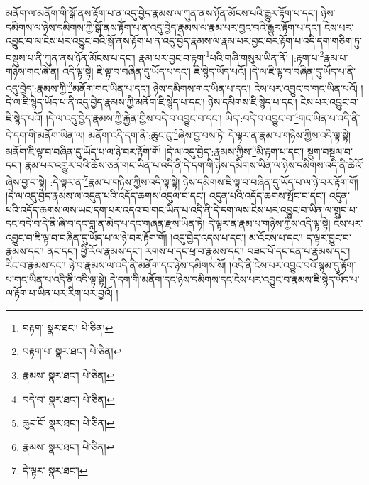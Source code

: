མནོག་ལ་མནོག་གི་སྒོ་ནས་རྟོག་པ་ན་འདུ་བྱེད་རྣམས་ལ་ཀུན་ནས་ཉོན་མོངས་པའི་རྒྱུར་རྟོག་པ་དང་། ཉེས་དམིགས་ལ་ཉེས་དམིགས་ཀྱི་སྒོ་ནས་རྟོག་པ་ན་འདུ་བྱེད་རྣམས་ལ་རྣམ་པར་བྱང་བའི་རྒྱུར་རྟོག་པ་དང་། ངེས་པར་འབྱུང་བ་ལ་ངེས་པར་འབྱུང་བའི་སྒོ་ནས་རྟོག་པ་ན་འདུ་བྱེད་རྣམས་ལ་རྣམ་པར་བྱང་བར་རྟོག་པ་འདི་དག་གཅིག་ཏུ་བསྡུས་པ་ནི་ཀུན་ནས་ཉོན་མོངས་པ་དང་། རྣམ་པར་བྱང་བ་རྟག་\footnote{བརྟག་  སྣར་ཐང་།  པེ་ཅིན། }པའི་གཞི་གསུམ་ཡིན་ནོ། །:རྟག་པ་\footnote{བརྟག་པ་  སྣར་ཐང་།  པེ་ཅིན། }རྣམ་པ་གཉིས་གང་ཞེ་ན། འདི་ལྟ་སྟེ། ཇི་ལྟ་བ་བཞིན་དུ་ཡོད་པ་དང་། ཇི་སྙེད་ཡོད་པའོ། །དེ་ལ་ཇི་ལྟ་བ་བཞིན་དུ་ཡོད་པ་ནི་འདུ་བྱེད་:རྣམས་ཀྱི་\footnote{རྣམས་  སྣར་ཐང་།  པེ་ཅིན། }མནོག་གང་ཡིན་པ་དང་། ཉེས་དམིགས་གང་ཡིན་པ་དང་། ངེས་པར་འབྱུང་བ་གང་ཡིན་པའོ། །དེ་ལ་ཇི་སྙེད་ཡོད་པ་ནི་འདུ་བྱེད་རྣམས་ཀྱི་མནོག་ཇི་སྙེད་པ་དང་། ཉེས་དམིགས་ཇི་སྙེད་པ་དང་། ངེས་པར་འབྱུང་བ་ཇི་སྙེད་པའོ། །དེ་ལ་འདུ་བྱེད་རྣམས་ཀྱི་རྐྱེན་གྱིས་བདེ་བ་འབྱུང་བ་དང་། ཡིད་:བདེ་བ་འབྱུང་བ་\footnote{བདེ་བ་  སྣར་ཐང་།  པེ་ཅིན། }གང་ཡིན་པ་འདི་ནི་དེ་དག་གི་མནོག་ཡིན་ལ། མནོག་འདི་དག་ནི་:ཆུང་ངུ་\footnote{ཆུང་ངོ་  སྣར་ཐང་།  པེ་ཅིན། }ཞེས་བྱ་བས་ཏེ། དེ་ལྟར་ན་རྣམ་པ་གཉིས་ཀྱིས་འདི་ལྟ་སྟེ། མནོག་ཇི་ལྟ་བ་བཞིན་དུ་ཡོད་པ་ལ་ཉེ་བར་རྟོག་གོ། །དེ་ལ་འདུ་བྱེད་:རྣམས་ཀྱིས་\footnote{རྣམས་  སྣར་ཐང་།  པེ་ཅིན། }མི་རྟག་པ་དང་། སྡུག་བསྔལ་བ་དང་། རྣམ་པར་འགྱུར་བའི་ཆོས་ཅན་གང་ཡིན་པ་འདི་ནི་དེ་དག་གི་ཉེས་དམིགས་ཡིན་ལ་ཉེས་དམིགས་འདི་ནི་ཆེའོ་ཞེས་བྱ་བ་སྟེ། :དེ་ལྟར་ན་\footnote{དེ་ལྟར་  སྣར་ཐང་། }རྣམ་པ་གཉིས་ཀྱིས་འདི་ལྟ་སྟེ། ཉེས་དམིགས་ཇི་ལྟ་བ་བཞིན་དུ་ཡོད་པ་ལ་ཉེ་བར་རྟོག་གོ། །དེ་ལ་འདུ་བྱེད་རྣམས་ལ་འདུན་པའི་འདོད་ཆགས་འདུལ་བ་དང་། འདུན་པའི་འདོད་ཆགས་སྤོང་བ་དང་། འདུན་པའི་འདོད་ཆགས་ལས་ཡང་དག་པར་འདའ་བ་གང་ཡིན་པ་འདི་ནི་དེ་དག་ལས་ངེས་པར་འབྱུང་བ་ཡིན་ལ་གྲུབ་པ་དང་བདེ་བ་དེ་ནི་ཞི་བ་དང་བླ་ན་མེད་པ་དང་གཞན་རྫས་ཡིན་ཏེ། དེ་ལྟར་ན་རྣམ་པ་གཉིས་ཀྱིས་འདི་ལྟ་སྟེ། ངེས་པར་འབྱུང་བ་ཇི་ལྟ་བ་བཞིན་དུ་ཡོད་པ་ལ་ཉེ་བར་རྟོག་གོ། །འདུ་བྱེད་འདས་པ་དང་། མ་འོངས་པ་དང་། ད་ལྟར་བྱུང་བ་རྣམས་དང་། ནང་དང་། ཕྱི་རོལ་རྣམས་དང་། རགས་པ་དང་ཕྲ་བ་རྣམས་དང་། བཟང་པོ་དང་ངན་པ་རྣམས་དང་། རིང་བ་རྣམས་དང་། ཉེ་བ་རྣམས་ལ་འདི་ནི་མནོག་དང་ཉེས་དམིགས་སོ། །འདི་ནི་ངེས་པར་འབྱུང་བའོ་སྙམ་དུ་རྟོག་པ་གང་ཡིན་པ་འདི་ནི་འདི་ལྟ་སྟེ། དེ་དག་གི་མནོག་དང་ཉེས་དམིགས་དང་ངེས་པར་འབྱུང་བ་རྣམས་ཇི་སྙེད་ཡོད་པ་ལ་རྟོག་པ་ཡིན་པར་རིག་པར་བྱའོ། །

